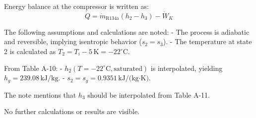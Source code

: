 Energy balance at the compressor is written as:  
\[
\dot{Q} = \dot{m}_{\text{R134a}} (h_2 - h_3) - \dot{W}_K
\]

The following assumptions and calculations are noted:  
- The process is adiabatic and reversible, implying isentropic behavior (\( s_2 = s_3 \)).  
- The temperature at state 2 is calculated as \( T_2 = T_i - 5 \, \text{K} = -22^\circ\text{C} \).  

From Table A-10:  
- \( h_2(T = -22^\circ\text{C}, \text{saturated}) \) is interpolated, yielding \( h_g = 239.08 \, \text{kJ/kg} \).  
- \( s_2 = s_g = 0.9351 \, \text{kJ/(kg·K)} \).  

The note mentions that \( h_3 \) should be interpolated from Table A-11.  

No further calculations or results are visible.